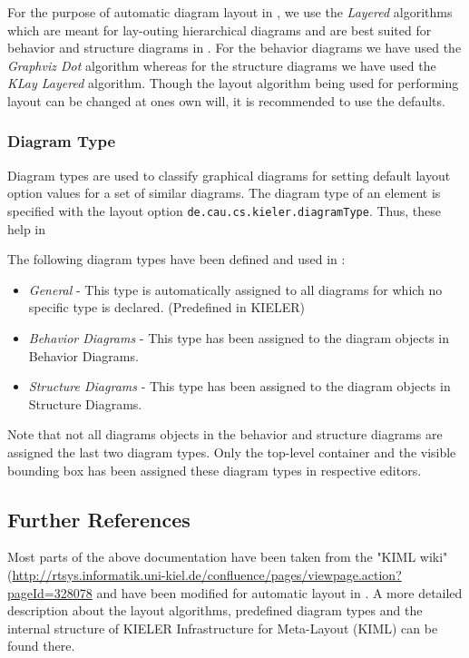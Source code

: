 For the purpose of automatic diagram layout in \eTrice{}, we use the \textit{Layered} algorithms which are 
meant for lay-outing hierarchical diagrams and are best suited for behavior and structure diagrams in 
\eTrice{}. For the behavior diagrams we have used the \textit{Graphviz Dot} algorithm whereas for the 
structure diagrams we have used the \textit{KLay Layered} algorithm. Though the layout algorithm being 
used for performing layout can be changed at ones own will, it is recommended to use the defaults.  

\subsubsection{Diagram Type}

Diagram types are used to classify graphical diagrams for setting default layout option values for a set 
of similar diagrams. The diagram type of an element is specified with the layout option 
\texttt{de.cau.cs.kieler.diagramType}. Thus, these help in 

The following diagram types have been defined and used in \eTrice{}:
\begin{itemize}
\item \textit{General} - This type is automatically assigned to all diagrams for which no specific type is 
declared. (Predefined in KIELER)
\item \textit{\eTrice{} Behavior Diagrams} - This type has been assigned to the diagram objects in \eTrice{} 
Behavior Diagrams. 
\item \textit{\eTrice{} Structure Diagrams} - This type has been assigned to the diagram objects in \eTrice{} 
Structure Diagrams.
\end{itemize}
Note that not all diagrams objects in the behavior and structure diagrams are assigned the last two 
diagram types. Only the top-level container and the visible bounding box has been assigned these diagram 
types in respective editors.

\subsection{Further References}

Most parts of the above documentation have been taken from the "KIML wiki"
(\url{http://rtsys.informatik.uni-kiel.de/confluence/pages/viewpage.action?pageId=328078}
and have been 
modified for automatic layout in \eTrice{}. A more detailed description about the layout algorithms, 
predefined diagram types and the internal structure of KIELER Infrastructure for Meta-Layout (KIML) can be 
found there.
